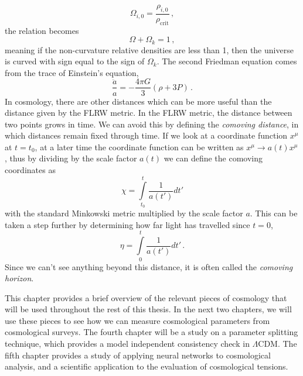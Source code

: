 \begin{equation}
    \Omega_{i,0} = \frac{\rho_{i,0}}{\rho_\mathrm{crit}}\,,
\end{equation}
the relation becomes
\begin{equation}
    \Omega + \Omega_k = 1 \,,
\end{equation}
meaning if the non-curvature relative densities are less than 1, then the universe is curved with sign equal to the sign of $\Omega_k$. 
The second Friedman equation comes from the trace of Einstein's equation,
\begin{equation}
    \frac{\ddot a}{a} = -\frac{4\pi G}{3}(\rho + 3P)\,.
\end{equation}
In cosmology, there are other distances which can be more useful than the distance given by the FLRW metric. In the FLRW metric, the distance between two points grows in time. 
We can avoid this by defining the \textit{comoving distance}, in which distances remain fixed through time. 
If we look at a coordinate function $x^\mu$ at $t=t_0$, at a later time the coordinate function can be written as $x^\mu \rightarrow a(t) x^\mu$, thus by dividing by the scale factor $a(t)$ we can define the comoving coordinates as
\begin{equation}
    \chi = \int\limits^{t}_{t_0} \frac{1}{a(t')} dt'
\end{equation}
with the standard Minkowski metric multiplied by the scale factor $a$. This can be taken a step further by determining how far light has travelled since $t=0$,
\begin{equation}
    \eta = \int\limits^t_0 \frac{1}{a(t')}dt'\,.
\end{equation}
Since we can't see anything beyond this distance, it is often called the \textit{comoving horizon}. 

This chapter provides a brief overview of the relevant pieces of cosmology that will be used throughout the rest of this thesis. In the next two chapters, we will use these pieces to see how we can measure cosmological parameters from cosmological surveys. The fourth chapter will be a study on a parameter splitting technique, which provides a model independent consistency check in $\Lambda$CDM. The fifth chapter provides a study of applying neural networks to cosmological analysis, and a scientific application to the evaluation of cosmological tensions.